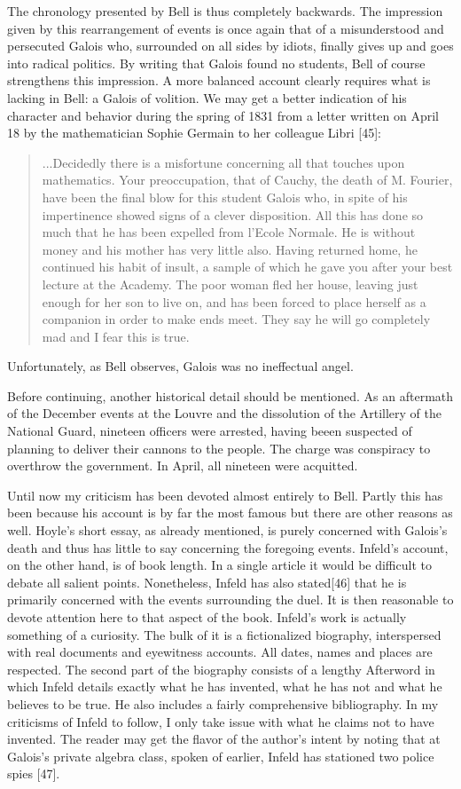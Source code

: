 \documentclass[12pt]{article}
\begin{document}
The chronology presented by Bell is thus completely backwards. The impression given by this rearrangement of events is once again that of a misunderstood and persecuted Galois who, surrounded on all sides by idiots, finally gives up and goes into radical politics. By writing that Galois found no students, Bell of course strengthens this impression. A more balanced account clearly requires what is lacking in Bell: a Galois of volition. We may get a better indication of his character and behavior during the spring of 1831 from a letter written on April 18 by the mathematician Sophie Germain to her colleague Libri [45]:

\begin{quote}
...Decidedly there is a misfortune concerning all that touches upon mathematics. Your preoccupation, that of Cauchy, the death of M. Fourier, have been the final blow for this student Galois who, in spite of his impertinence showed signs of a clever disposition. All this has done so much that he has been expelled from l'Ecole Normale. He is without money and his mother has very little also. Having returned home, he continued his habit of insult, a sample of which he gave you after your best lecture at the Academy. The poor woman fled her house, leaving just enough for her son to live on, and has been forced to place herself as a companion in order to make ends meet. They say he will go completely mad and I fear this is true.
\end{quote}
Unfortunately, as Bell observes, Galois was no ineffectual angel.

Before continuing, another historical detail should be mentioned. As an aftermath of the December events at the Louvre and the dissolution of the Artillery of the National Guard, nineteen officers were arrested, having beeen suspected of planning to deliver their cannons to the people. The charge was conspiracy to overthrow the government. In April, all nineteen were acquitted.

Until now my criticism has been devoted almost entirely to Bell. Partly this has been because his account is by far the most famous but there are other reasons as well. Hoyle's short essay, as already mentioned, is purely concerned with Galois's death and thus has little to say concerning the foregoing events. Infeld's account, on the other hand, is of book length. In a single article it would be difficult to debate all salient points. Nonetheless, Infeld has also stated[46] that he is primarily concerned with the events surrounding the duel. It is then reasonable to devote attention here to that aspect of the book. Infeld's work is actually something of a curiosity. The bulk of it is a fictionalized biography, interspersed with real documents and eyewitness accounts. All dates, names and places are respected. The second part of the biography consists of a lengthy Afterword in which Infeld details exactly what he has invented, what he has not and what he believes to be true. He also includes a fairly comprehensive bibliography. In my criticisms of Infeld to follow, I only take issue with what he claims not to have invented. The reader may get the flavor of the author's intent by noting that at Galois's private algebra class, spoken of earlier, Infeld has stationed two police spies [47].
\end{document}
